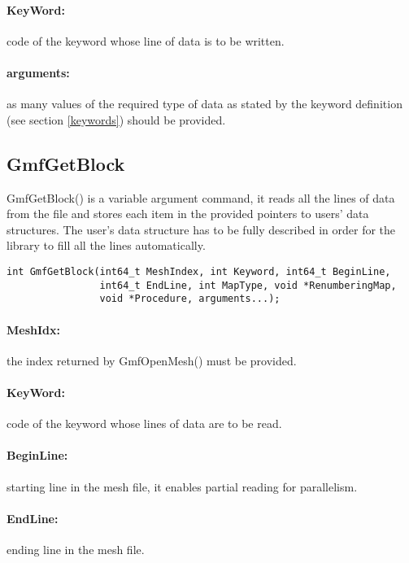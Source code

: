 \documentclass[a4paper,12pt]{article}
\begin{document}
\paragraph{KeyWord:} code of the keyword whose line of data is to be written.

\paragraph{arguments:} as many values of the required type of data as stated by the keyword definition (see section \ref{keywords}) should be provided.


\subsection{GmfGetBlock}
GmfGetBlock() is a variable argument command, it reads all the lines of data from the file and stores each item in the provided pointers to users' data structures. The user's data structure has to be fully described in order for the library to fill all the lines automatically.

\begin{tt}
\begin{verbatim}
int GmfGetBlock(int64_t MeshIndex, int Keyword, int64_t BeginLine, 
                int64_t EndLine, int MapType, void *RenumberingMap,
                void *Procedure, arguments...);
\end{verbatim}
\end{tt}
\normalfont

\paragraph{MeshIdx:}
the index returned by GmfOpenMesh() must be provided.

\paragraph{KeyWord:} code of the keyword whose lines of data are to be read.

\paragraph{BeginLine:} starting line in the mesh file, it enables partial reading for parallelism.

\paragraph{EndLine:} ending line in the mesh file.
\end{document}
